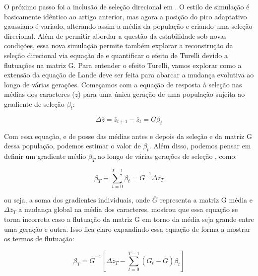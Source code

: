 O próximo passo foi a inclusão de seleção direcional em \cite{Jones2004}. 
O estilo de simulação é basicamente idêntico ao artigo anterior, mas
agora a posição do pico adaptativo gaussiano é variado, alterando assim
a média da população e criando uma seleção direcional. 
Além de permitir abordar a questão da estabilidade sob novas condições,
essa nova simulação permite também explorar a reconstrução da seleção
direcional via equação de \cite{Lande1979} e quantificar o efeito de
Turelli devido a flutuações na matriz G. 
Para entender o efeito Turelli, vamos explorar como a extensão da
equação de Lande deve ser feita para abarcar a mudança evolutiva ao
longo de várias gerações. 
Começamos com a equação de resposta à seleção nas médias dos caracteres
($\overline {z}$) para uma única geração de uma população sujeita ao
gradiente de seleção $\beta_t$:

\begin{equation}
\Delta \overline {z} = \overline {z}_{t+1}-\overline {z}_{t}=G\beta_t
\end{equation}

Com essa equação, e de posse das médias antes e depois da seleção e da
matriz G dessa população, podemos estimar o valor de $\beta_t$. 
Além disso, podemos pensar em definir um gradiente médio $\beta_T$  ao
longo de várias gerações de seleção \citep{Lande1979}, como:

\begin{equation}
\beta_{T}\equiv \sum _{t=0}^{T-1} \beta_t =  \overline {G}^{-1}\Delta \overline {z}_T 
\label{betatotal}
\end{equation}

ou seja, a soma dos gradientes individuais, onde $\overline {G}$
representa a matriz G média e $\Delta \overline {z}_T$ a mudança global
na média dos caracteres. 
\cite{Turelli1988} mostrou que essa equação se torna incorreta caso a
flutuação da matriz G em torno da média seja grande entre uma geração e
outra. 
Isso fica claro expandindo essa equação de forma a mostrar os termos de
flutuação:

\begin{equation}
   \beta_T = \overline {G}^{-1} \left[ \Delta \overline {z}_T - \sum_{t=0}^{T-1} (G_t - \overline {G}) \beta_t\right]
\end{equation}

